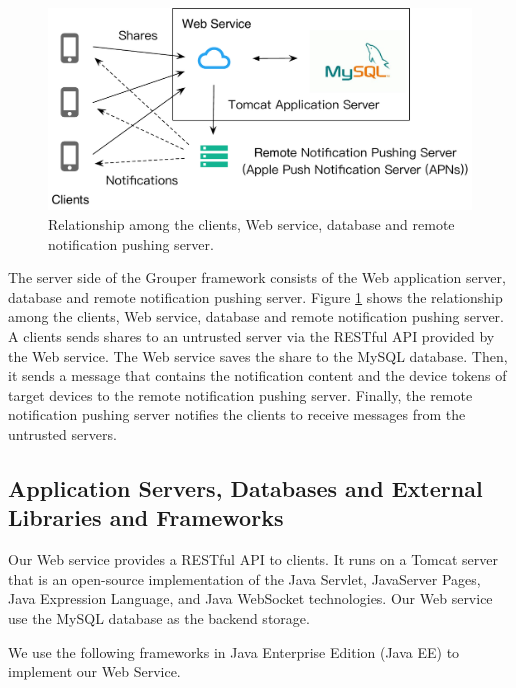 \documentclass[a4paper,11pt]{report}
\begin{document}
\begin{figure}
	\centering
	\includegraphics[scale=0.6]{server_client}
	\caption{Relationship among the clients, Web service, database and remote notification pushing server.}
	\label{fig:server_client}
\end{figure}

The server side of the Grouper framework consists of the Web application server, database and remote notiﬁcation pushing server.
Figure \ref{fig:server_client} shows the relationship among the clients, Web service, database and remote notification pushing server.
A clients sends shares to an untrusted server via the RESTful API provided by the Web service.
The Web service saves the share to the MySQL database.
Then, it sends a message that contains the notification content and the device tokens of target devices to the remote notification pushing server.
Finally, the remote notification pushing server notifies the clients to receive messages from the untrusted servers.

\subsection{Application Servers, Databases and External Libraries and Frameworks} \label{subsection:dependencies_client}

Our Web service provides a RESTful API to clients.
It runs on a Tomcat server\cite{tomcat} that is an open-source implementation of the Java Servlet, JavaServer Pages, Java Expression Language, and Java WebSocket technologies.
Our Web service use the MySQL\cite{mysql} database as the backend storage.

We use the following frameworks in Java Enterprise Edition (Java EE) to implement our Web Service.
\end{document}
